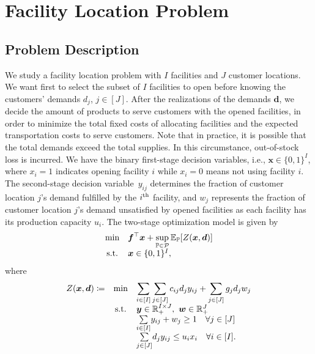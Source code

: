 \documentclass{article}
\newcommand{\st}{\textnormal{s.t.}}
\newcommand{\PP}{\mathbb{P}}
\newcommand{\EE}{\mathbb{E}}
\begin{document}
\section{Facility Location Problem}

\subsection{Problem Description} 
We study a facility location problem with $I$ facilities and $J$ customer locations. We want first to select the subset of $I$ facilities to open before knowing the customers' demands $d_j$, $j \in [J]$. After the realizations of the demands $\bm d$, we decide the amount of products to serve customers with the opened facilities, in order to minimize the total fixed costs of allocating facilities and the expected transportation costs to serve customers. Note that in practice, it is possible that the total demands exceed the total supplies. In this circumstance, out-of-stock loss is incurred. We have the binary first-stage decision variables, i.e., $\bm x \in \{ 0,1\}^I$, where $x_i = 1$ indicates opening facility $i$ while $x_i = 0$ means not using facility $i$. The second-stage decision variable~$y_{ij}$ determines the fraction of customer location $j$'s demand fulfilled by the $i^{\textup{th}}$ facility, and $w_{j}$ represents the fraction of customer location $j$'s demand unsatisfied by opened facilities as each facility has its production capacity $u_i$. The two-stage optimization model is given by
\begin{equation}
\label{exp:facility-location-problem}
\begin{array}{clll}
  \displaystyle  \text{min} & \displaystyle \bm f^\top \bm x + \sup_{\PP\in\mathcal P}\EE_\PP [Z (\bm x, \bm d)] \\
  \st & \bm x \in \{0,1\}^{I}, \\ 
\end{array}
\end{equation}
where 
\begin{equation*}
\begin{array}{ccll}
  \displaystyle Z(\bm x, \bm d) \coloneqq & \displaystyle \text{min} & \displaystyle \sum_{i \in [I]} \sum_{j \in [J]} c_{ij} d_{j} y_{ij} + \sum_{j \in [J]} g_{j} d_{j} w_{j} \\
  & \st & \bm y \in \mathbb{R}_{+}^{I \times J}, \ \bm w \in \mathbb{R}_{+}^{J} \\
  &  & \underset{i \in [I]}{\sum} y_{ij} + w_j \geq 1 \quad  \forall j \in [J] \\
  &  & \underset{j \in [J]}{\sum} d_j y_{ij} \leq u_i x_i \quad  \forall i \in [I]. \\ 
\end{array}
\end{equation*}
\end{document}
